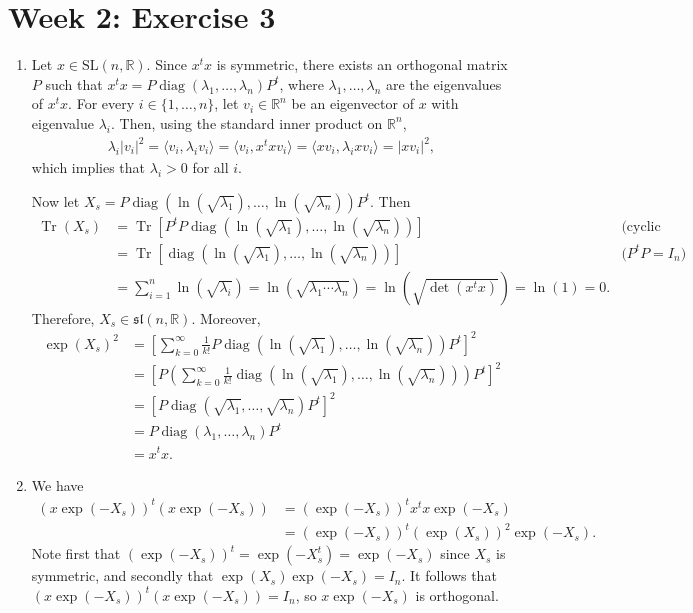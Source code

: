 \documentclass{article}
\DeclareMathOperator{\Tr}{Tr}
\newcommand{\bb}{\mathbb}
\theoremstyle{remark}
\newcommand{\SL}{\mathrm{SL}}
\DeclareMathOperator{\diag}{\mathrm{diag}}
\begin{document}
\section*{Week 2: Exercise 3}
\begin{enumerate}[label=(\roman*)]
    \item Let $x \in \SL(n,\bb{R})$. Since $x^tx$ is symmetric, there exists an orthogonal matrix $P$ such that $x^tx = P\diag(\lambda_1, \ldots, \lambda_n)P^t$, where $\lambda_1, \ldots, \lambda_n$ are the eigenvalues of $x^tx$. For every $i \in \{1, \ldots, n\}$, let $v_i \in \bb{R}^n$ be an eigenvector of $x$ with eigenvalue $\lambda_i$. Then, using the standard inner product on $\bb{R}^n$,
    \begin{align*}
        \lambda_i |v_i|^2 = \langle v_i, \lambda_i v_i \rangle = \langle v_i, x^tx v_i \rangle = \langle xv_i, \lambda_i xv_i \rangle = |xv_i|^2,
    \end{align*}
    which implies that $\lambda_i>0$ for all $i$.

    Now let $X_s = P \diag(\ln(\sqrt{\lambda_1}), \ldots, \ln(\sqrt{\lambda_n})) P^t$. Then
    \begin{align*}
        \Tr(X_s) &= \Tr \left[ P^tP \diag(\ln(\sqrt{\lambda_1}), \ldots, \ln(\sqrt{\lambda_n})) \right] &\text{(cyclic property of trace)} \\
        &= \Tr \left[ \diag(\ln(\sqrt{\lambda_1}), \ldots, \ln(\sqrt{\lambda_n})) \right] &\text{($P^tP = I_n$)} \\
        &= \sum_{i=1}^{n} \ln(\sqrt{\lambda_i}) = \ln(\sqrt{\lambda_1 \cdots \lambda_n}) = \ln (\sqrt{\det(x^tx)}) = \ln(1) = 0.
    \end{align*}
    Therefore, $X_s \in \mathfrak{sl}(n,\bb{R})$. Moreover,
    \begin{align*}
        \exp(X_s)^2 &= \left[  \sum_{k=0}^{\infty} \frac{1}{k!} P \diag(\ln(\sqrt{\lambda_1}), \ldots, \ln(\sqrt{\lambda_n})) P^t \right]^2 \\
        &= \left[ P \left(\sum_{k=0}^{\infty} \frac{1}{k!}  \diag(\ln(\sqrt{\lambda_1}), \ldots, \ln(\sqrt{\lambda_n})) \right) P^t \right]^2 \\
        &= \left[ P \diag(\sqrt{\lambda_1}, \ldots, \sqrt{\lambda_n}) P^t\right]^2 \\
        &= P \diag(\lambda_1, \ldots, \lambda_n) P^t \\
        &= x^tx.
    \end{align*}

    \item We have 
    \begin{align*}
        \left(x \exp(-X_s)\right)^t \left(x \exp(-X_s)\right) &= \left(\exp(-X_s)\right)^t x^t x \exp(-X_s) \\
        &= \left(\exp(-X_s)\right)^t \left(\exp(X_s)\right)^2 \exp(-X_s).
    \end{align*}
    Note first that $\left(\exp(-X_s)\right)^t = \exp(-X_s^t) = \exp(-X_s)$ since $X_s$ is symmetric, and secondly that $\exp(X_s)\exp(-X_s) = I_n$. It follows that $\left(x \exp(-X_s)\right)^t \left(x \exp(-X_s)\right) = I_n$, so $x \exp(-X_s)$ is orthogonal.


\end{enumerate}
\end{document}
